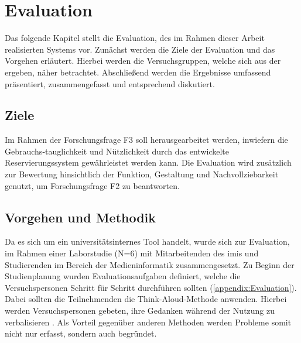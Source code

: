 

\chapter{Evaluation}
\label{chapter-evaluation}
Das folgende Kapitel stellt die Evaluation, des im Rahmen dieser Arbeit
realisierten Systems vor. Zunächst werden die Ziele der Evaluation und das
Vorgehen erläutert. Hierbei werden die Versuchsgruppen, welche sich aus der
 ergeben, näher betrachtet. Abschließend werden die
Ergebnisse umfassend präsentiert, zusammengefasst und entsprechend diskutiert.

\section{Ziele}
Im Rahmen der Forschungsfrage F3 soll herausgearbeitet werden, inwiefern die
Gebrauchs-tauglichkeit und Nützlichkeit durch das entwickelte Reservierungssystem
gewährleistet werden kann. Die Evaluation wird zusätzlich zur Bewertung
hinsichtlich der Funktion, Gestaltung und Nachvollziebarkeit genutzt, um
Forschungsfrage F2 zu beantworten.


\section{Vorgehen und Methodik}
Da es sich um ein universitätsinternes Tool handelt, wurde sich zur Evaluation,
im Rahmen einer Laborstudie (N=6) mit Mitarbeitenden des \ac{imis} und
Studierenden im Bereich der Medieninformatik zusammengesetzt. Zu Beginn der
Studienplanung wurden Evaluationsaufgaben definiert, welche die Versuchspersonen
Schritt für Schritt durchführen sollten (\ref{appendix:Evaluation}). Dabei
sollten die Teilnehmenden die Think-Aloud-Methode anwenden. Hierbei werden
Versuchspersonen gebeten, ihre Gedanken während der Nutzung zu verbalisieren
\cite{nielsen_usability_1994}. Als Vorteil gegenüber anderen Methoden werden
Probleme somit nicht nur erfasst, sondern auch begründet\cite{nielsen_think}.

